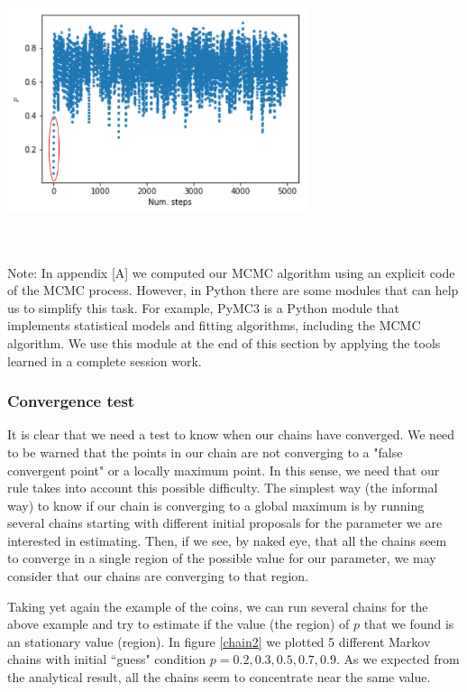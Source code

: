 \documentclass[onecolumn,           %
               showpacs,            %
               preprintnumbers,     %
               aps,                 %
               letterpaper,             %
               superscriptaddress,      %
               nofootinbib,         %
               tightenlines,        %
               floats,floatfix      %
               ,usenatbib,
               ]{revtex4-1}
\begin{document}
\begin{minipage}{\textwidth}
\centering
\includegraphics[height=6cm]{Figures/chain1.png}
\label{chain1}
\end{minipage}\\ $ $ \\

Note: In appendix [A] we computed our MCMC algorithm using an explicit code of the MCMC process. However, in Python there are some modules that can help us to simplify this task. For example, PyMC3 is a Python module that implements statistical models and fitting algorithms, including the MCMC algorithm. We use this module at the end of this section  by applying the tools learned in a complete session work.

\subsubsection{Convergence test} 
It is clear that we need a test to know when our chains have converged. We need to be warned that the points in our chain are not converging to a "false convergent point" or a locally maximum point. In this sense, we need that our rule takes into account this possible difficulty. The simplest way (the informal way) to know if our chain is converging to a global maximum is by running several chains starting with different initial proposals for the parameter we are interested in estimating. Then, if we see, by naked eye, that all the chains seem to converge in a single region of the possible value for our parameter, we may consider that our chains are converging to that region. 

Taking yet again the example of the coins, we can run several chains for the above example and try to estimate if the value (the region) of $p$ that we found is an stationary value (region). In figure \ref{chain2} we plotted 5 different Markov chains with initial ``guess" condition $p=0.2,0.3,0.5,0.7,0.9$. As we expected from the analytical result, all the chains seem to concentrate near the same value.
\end{document}
